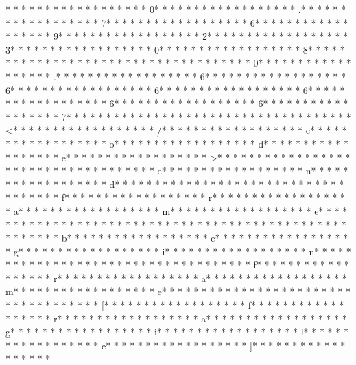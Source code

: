 * * *  * * *  * * *  *  * * *  *  * * *  * 0* * *  * * *  * * *  *  * * *  *  * * *  * .* * *  * * *  * * *  *  * * *  *  * * *  * 7* * *  * * *  * * *  *  * * *  *  * * *  * 6* * *  * * *  * * *  *  * * *  *  * * *  * 9* * *  * * *  * * *  *  * * *  *  * * *  * 2* * *  * * *  * * *  *  * * *  *  * * *  * 3* * *  * * *  * * *  *  * * *  *  * * *  * 0* * *  * * *  * * *  *  * * *  *  * * *  * 8* * *  * * *  * * *  *  * * *  *  * * *  *  * * *  * * *  * * *  *  * * *  *  * * *  * 0* * *  * * *  * * *  *  * * *  *  * * *  * .* * *  * * *  * * *  *  * * *  *  * * *  * 6* * *  * * *  * * *  *  * * *  *  * * *  * 6* * *  * * *  * * *  *  * * *  *  * * *  * 6* * *  * * *  * * *  *  * * *  *  * * *  * 6* * *  * * *  * * *  *  * * *  *  * * *  * 6* * *  * * *  * * *  *  * * *  *  * * *  * 6* * *  * * *  * * *  *  * * *  *  * * *  * 7* * *  * * *  * * *  *  * * *  *  * * *  * 
* * *  * * *  * * *  *  * * *  *  * * *  * <* * *  * * *  * * *  *  * * *  *  * * *  * /* * *  * * *  * * *  *  * * *  *  * * *  * c* * *  * * *  * * *  *  * * *  *  * * *  * o* * *  * * *  * * *  *  * * *  *  * * *  * d* * *  * * *  * * *  *  * * *  *  * * *  * e* * *  * * *  * * *  *  * * *  *  * * *  * >* * *  * * *  * * *  *  * * *  *  * * *  * 
* * *  * * *  * * *  *  * * *  *  * * *  * e* * *  * * *  * * *  *  * * *  *  * * *  * n* * *  * * *  * * *  *  * * *  *  * * *  * d* * *  * * *  * * *  *  * * *  *  * * *  * {* * *  * * *  * * *  *  * * *  *  * * *  * f* * *  * * *  * * *  *  * * *  *  * * *  * r* * *  * * *  * * *  *  * * *  *  * * *  * a* * *  * * *  * * *  *  * * *  *  * * *  * m* * *  * * *  * * *  *  * * *  *  * * *  * e* * *  * * *  * * *  *  * * *  *  * * *  * }* * *  * * *  * * *  *  * * *  *  * * *  * 
* * *  * * *  * * *  *  * * *  *  * * *  * b* * *  * * *  * * *  *  * * *  *  * * *  * e* * *  * * *  * * *  *  * * *  *  * * *  * g* * *  * * *  * * *  *  * * *  *  * * *  * i* * *  * * *  * * *  *  * * *  *  * * *  * n* * *  * * *  * * *  *  * * *  *  * * *  * {* * *  * * *  * * *  *  * * *  *  * * *  * f* * *  * * *  * * *  *  * * *  *  * * *  * r* * *  * * *  * * *  *  * * *  *  * * *  * a* * *  * * *  * * *  *  * * *  *  * * *  * m* * *  * * *  * * *  *  * * *  *  * * *  * e* * *  * * *  * * *  *  * * *  *  * * *  * }* * *  * * *  * * *  *  * * *  *  * * *  * [* * *  * * *  * * *  *  * * *  *  * * *  * f* * *  * * *  * * *  *  * * *  *  * * *  * r* * *  * * *  * * *  *  * * *  *  * * *  * a* * *  * * *  * * *  *  * * *  *  * * *  * g* * *  * * *  * * *  *  * * *  *  * * *  * i* * *  * * *  * * *  *  * * *  *  * * *  * l* * *  * * *  * * *  *  * * *  *  * * *  * e* * *  * * *  * * *  *  * * *  *  * * *  * ]* * *  * * *  * * *  *  * * *  *  * * *  * 
